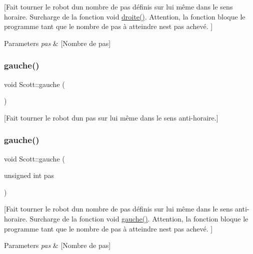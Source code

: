 \mbox{[}Fait tourner le robot d\textquotesingle{}un nombre de pas définis sur lui même dans le sens horaire. Surcharge de la fonction void \hyperlink{class_scott_aa3619ee2b7866d3274818347f10578ed}{droite()}. Attention, la fonction bloque le programme tant que le nombre de pas à atteindre n\textquotesingle{}est pas achevé. \mbox{]} 
\begin{DoxyParams}{Parameters}
{\em pas} & \mbox{[}Nombre de pas\mbox{]} \\
\hline
\end{DoxyParams}
\hypertarget{class_scott_a5773db050c4798913a84a429bd57e87a}{}\label{class_scott_a5773db050c4798913a84a429bd57e87a} 
\subsubsection{\texorpdfstring{gauche()}{gauche()}\hspace{0.1cm}{\footnotesize\ttfamily [1/2]}}
{\footnotesize\ttfamily void Scott\+::gauche (\begin{DoxyParamCaption}{ }\end{DoxyParamCaption})}

\mbox{[}Fait tourner le robot d\textquotesingle{}un pas sur lui même dans le sens anti-\/horaire.\mbox{]} \hypertarget{class_scott_a7f52564ed11006cdb8c2e6346d1db58a}{}\label{class_scott_a7f52564ed11006cdb8c2e6346d1db58a} 
\subsubsection{\texorpdfstring{gauche()}{gauche()}\hspace{0.1cm}{\footnotesize\ttfamily [2/2]}}
{\footnotesize\ttfamily void Scott\+::gauche (\begin{DoxyParamCaption}\item[{unsigned int}]{pas }\end{DoxyParamCaption})}

\mbox{[}Fait tourner le robot d\textquotesingle{}un nombre de pas définis sur lui même dans le sens anti-\/horaire. Surcharge de la fonction void \hyperlink{class_scott_a5773db050c4798913a84a429bd57e87a}{gauche()}. Attention, la fonction bloque le programme tant que le nombre de pas à atteindre n\textquotesingle{}est pas achevé. \mbox{]} 
\begin{DoxyParams}{Parameters}
{\em pas} & \mbox{[}Nombre de pas\mbox{]} \\
\hline
\end{DoxyParams}
\hypertarget{class_scott_ac14ba7d931832ec51632fd47fec2ce00}{}\label{class_scott_ac14ba7d931832ec51632fd47fec2ce00} 
